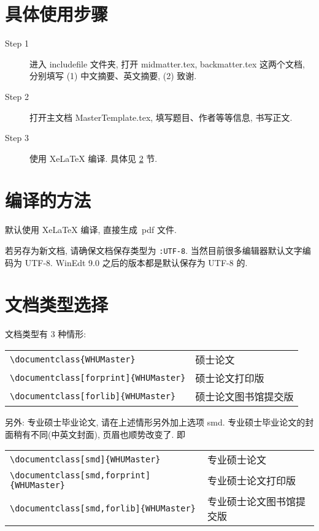 \documentclass{WHUMaster}   %
\begin{document}
\section{具体使用步骤}
\begin{description}

  \item[Step 1]  进入 includefile 文件夹,  打开 midmatter.tex,  backmatter.tex 这两个文档,
        分别填写 (1) 中文摘要、英文摘要, (2) 致谢.

  \item[Step 2]  打开主文档 MasterTemplate.tex, 填写题目、作者等等信息, 书写正文.

  \item[Step 3]  使用 XeLaTeX 编译. 具体见 \ref{sec-compile} 节.


\end{description}




\section{编译的方法}\label{sec-compile}

默认使用 XeLaTeX 编译, 直接生成~pdf 文件.

若另存为新文档, 请确保文档保存类型为 \verb|:UTF-8|. 当然目前很多编辑器默认文字编码为 UTF-8.
WinEdt 9.0 之后的版本都是默认保存为 UTF-8 的.



\section{文档类型选择}
文档类型有 3 种情形:

\begin{table}[ht]\centering
\begin{tabular}{ll}
\hline
   \verb|\documentclass{WHUMaster}|                 &  硕士论文 \\
   \verb|\documentclass[forprint]{WHUMaster}|    &  硕士论文打印版  \\
   \verb|\documentclass[forlib]{WHUMaster}|       &  硕士论文图书馆提交版  \\
\hline
\end{tabular}
\end{table}

另外: 专业硕士毕业论文, 请在上述情形另外加上选项 smd. 专业硕士毕业论文的封面稍有不同(中英文封面), 页眉也顺势改变了. 即
\begin{table}[ht]\centering
\begin{tabular}{ll}
\hline
   \verb|\documentclass[smd]{WHUMaster}|               &  专业硕士论文 \\
   \verb|\documentclass[smd,forprint]{WHUMaster}|    &  专业硕士论文打印版  \\
   \verb|\documentclass[smd,forlib]{WHUMaster}|       &  专业硕士论文图书馆提交版  \\
\hline
\end{tabular}
\end{table}
\end{document}
